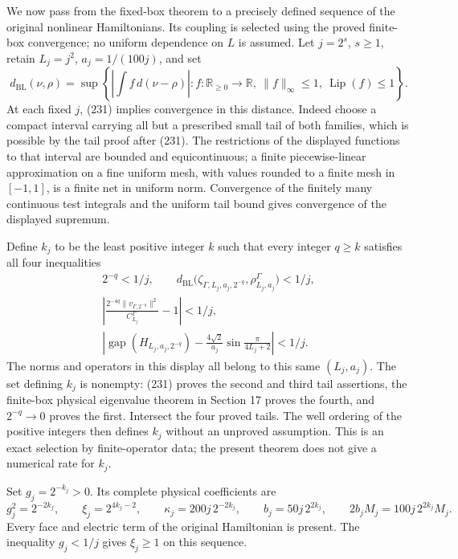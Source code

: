 \documentclass[
  11pt,
]{article}
\begin{document}
We now pass from the fixed-box theorem to a precisely defined sequence
of the original nonlinear Hamiltonians. Its coupling is selected using
the proved finite-box convergence; no uniform dependence on \(L\) is
assumed. Let \(j=2^s\), \(s\ge1\), retain \(L_j=j^2\), \(a_j=1/(100j)\),
and set \[
 d_{\mathrm{BL}}(\nu,\rho)=
 \sup\left\{\left|\int f\,d(\nu-\rho)\right|:
         f:\mathbb R_{\ge0}\to\mathbb R,\
         \|f\|_\infty\le1,\ \operatorname{Lip}(f)\le1\right\}.
 \tag{239}
\] At each fixed \(j\), (231) implies convergence in this distance.
Indeed choose a compact interval carrying all but a prescribed small
tail of both families, which is possible by the tail proof after (231).
The restrictions of the displayed functions to that interval are bounded
and equicontinuous; a finite piecewise-linear approximation on a fine
uniform mesh, with values rounded to a finite mesh in \([-1,1]\), is a
finite net in uniform norm. Convergence of the finitely many continuous
test integrals and the uniform tail bound gives convergence of the
displayed supremum.

Define \(k_j\) to be the least positive integer \(k\) such that every
integer \(q\ge k\) satisfies all four inequalities \[
 \begin{gathered}
 2^{-q}<1/j,\qquad
 d_{\mathrm{BL}}\bigl(
   \zeta_{\Gamma,L_j,a_j,2^{-q}},\rho_{L_j,a_j}^\Gamma\bigr)<1/j,\\
 \left|
   \frac{2^{-4q}\|v_{\Gamma,2^{-q}}\|^2}{C_{L_j}^\Gamma}-1
            \right|<1/j,\\
 \left|
  \operatorname{gap}(H_{L_j,a_j,2^{-q}})
    -\frac{4\sqrt2}{a_j}\sin\frac{\pi}{4L_j+2}
              \right|<1/j.
 \end{gathered}
 \tag{240}
\] The norms and operators in this display all belong to this same
\((L_j,a_j)\). The set defining \(k_j\) is nonempty: (231) proves the
second and third tail assertions, the finite-box physical eigenvalue
theorem in Section 17 proves the fourth, and \(2^{-q}\to0\) proves the
first. Intersect the four proved tails. The well ordering of the
positive integers then defines \(k_j\) without an unproved assumption.
This is an exact selection by finite-operator data; the present theorem
does not give a numerical rate for \(k_j\).

Set \(g_j=2^{-k_j}>0\). Its complete physical coefficients are \[
 g_j^2=2^{-2k_j},\qquad
 \xi_j=2^{4k_j-2},\qquad
 \kappa_j=200j\,2^{-2k_j},\qquad
 b_j=50j\,2^{2k_j},\qquad 2b_jM_j=100j\,2^{2k_j}M_j.
 \tag{241}
\] Every face and electric term of the original Hamiltonian is present.
The inequality \(g_j<1/j\) gives \(\xi_j\ge1\) on this sequence.
\end{document}
